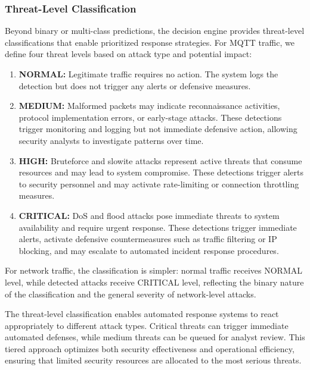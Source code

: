 \documentclass[conference]{IEEEtran}
\begin{document}
\subsubsection{Threat-Level Classification}

Beyond binary or multi-class predictions, the decision engine provides threat-level classifications that enable prioritized response strategies. For MQTT traffic, we define four threat levels based on attack type and potential impact:

\begin{enumerate}
\item \textbf{NORMAL:} Legitimate traffic requires no action. The system logs the detection but does not trigger any alerts or defensive measures.

\item \textbf{MEDIUM:} Malformed packets may indicate reconnaissance activities, protocol implementation errors, or early-stage attacks. These detections trigger monitoring and logging but not immediate defensive action, allowing security analysts to investigate patterns over time.

\item \textbf{HIGH:} Bruteforce and slowite attacks represent active threats that consume resources and may lead to system compromise. These detections trigger alerts to security personnel and may activate rate-limiting or connection throttling measures.

\item \textbf{CRITICAL:} DoS and flood attacks pose immediate threats to system availability and require urgent response. These detections trigger immediate alerts, activate defensive countermeasures such as traffic filtering or IP blocking, and may escalate to automated incident response procedures.
\end{enumerate}

For network traffic, the classification is simpler: normal traffic receives NORMAL level, while detected attacks receive CRITICAL level, reflecting the binary nature of the classification and the general severity of network-level attacks.

The threat-level classification enables automated response systems to react appropriately to different attack types. Critical threats can trigger immediate automated defenses, while medium threats can be queued for analyst review. This tiered approach optimizes both security effectiveness and operational efficiency, ensuring that limited security resources are allocated to the most serious threats.
\end{document}
